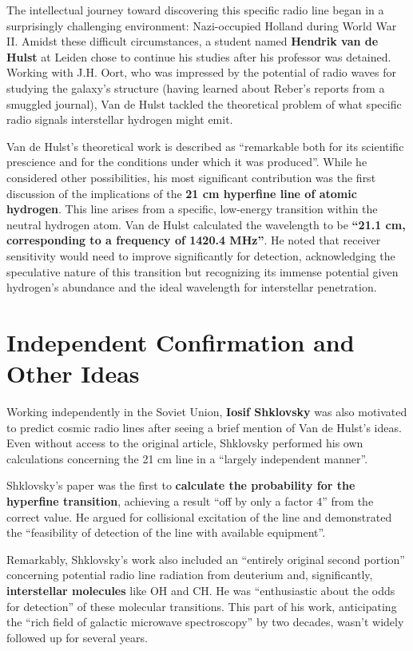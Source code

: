 \documentclass{../template/texnote}
\begin{document}
The intellectual journey toward discovering this specific radio line began in a surprisingly challenging environment: Nazi-occupied Holland during World War II.
Amidst these difficult circumstances, a student named \textbf{Hendrik van de Hulst} at Leiden chose to continue his studies after his professor was detained.
Working with J.H. Oort, who was impressed by the potential of radio waves for studying the galaxy's structure (having learned about Reber's reports from a smuggled journal), Van de Hulst tackled the theoretical problem of what specific radio signals interstellar hydrogen might emit.

Van de Hulst's theoretical work is described as ``remarkable both for its scientific prescience and for the conditions under which it was produced''.
While he considered other possibilities, his most significant contribution was the first discussion of the implications of the \textbf{21 cm hyperfine line of atomic hydrogen}.
This line arises from a specific, low-energy transition within the neutral hydrogen atom.
Van de Hulst calculated the wavelength to be \textbf{``21.1 cm, corresponding to a frequency of 1420.4 MHz''}.
He noted that receiver sensitivity would need to improve significantly for detection, acknowledging the speculative nature of this transition but recognizing its immense potential given hydrogen's abundance and the ideal wavelength for interstellar penetration.

\section{Independent Confirmation and Other Ideas}

Working independently in the Soviet Union, \textbf{Iosif Shklovsky} was also motivated to predict cosmic radio lines after seeing a brief mention of Van de Hulst's ideas.
Even without access to the original article, Shklovsky performed his own calculations concerning the 21 cm line in a ``largely independent manner''.

Shklovsky's paper was the first to \textbf{calculate the probability for the hyperfine transition}, achieving a result ``off by only a factor 4'' from the correct value.
He argued for collisional excitation of the line and demonstrated the ``feasibility of detection of the line with available equipment''.

Remarkably, Shklovsky's work also included an ``entirely original second portion'' concerning potential radio line radiation from deuterium and, significantly, \textbf{interstellar molecules} like OH and CH.
He was ``enthusiastic about the odds for detection'' of these molecular transitions.
This part of his work, anticipating the ``rich field of galactic microwave spectroscopy'' by two decades, wasn't widely followed up for several years.
\end{document}
